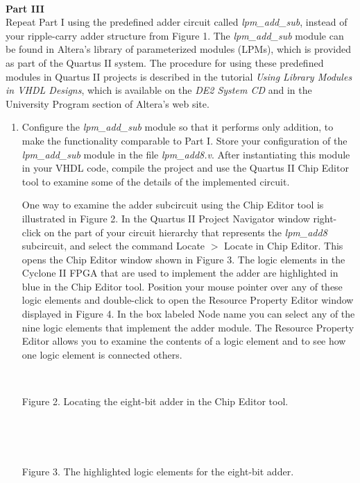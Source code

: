 \documentclass[psfig,10pt,fullpage]{article}
\begin{document}
~\\
\noindent
{\bf Part III}
~\\

\noindent
Repeat Part I using the predefined adder circuit called {\it lpm\_add\_sub}, instead of your
ripple-carry adder structure from Figure 1. The {\it lpm\_add\_sub} module can be found in
Altera's library of parameterized modules (LPMs), which is provided as part of the Quartus
II system.  The procedure for using these predefined modules in Quartus II projects 
is described in the tutorial {\it Using Library Modules in VHDL Designs}, which is available 
on the {\it DE2 System CD} and in the University Program section of Altera's web site.  
\begin{enumerate}
\item Configure the {\it lpm\_add\_sub} module so that it performs only addition, to make
the functionality comparable to Part I. Store your configuration of the {\it lpm\_add\_sub} 
module in the file {\it lpm\_add8.v}.  After instantiating this module in your 
VHDL code, compile the project and use the Quartus II Chip Editor tool to examine some 
of the details of the implemented circuit. 

One way to examine the adder subcircuit using the Chip Editor tool is illustrated in
Figure 2. In the Quartus II Project Navigator window right-click on the part of your
circuit hierarchy that represents the {\it lpm\_add8} subcircuit, and select the command
{\sf Locate} $>$ {\sf Locate in Chip Editor}. This opens the Chip Editor window 
shown in Figure 3. The logic elements in the Cyclone II FPGA that are used to implement
the adder are highlighted in blue in the Chip Editor tool.
Position your mouse pointer over any of these logic elements and double-click 
to open the Resource Property Editor window displayed in Figure 4. In the box labeled 
{\sf Node name} you can select any of the nine logic elements that implement the adder 
module. The Resource Property Editor allows you to examine the contents of a logic element and
to see how one logic element is connected others.

\begin{figure}[H]
\scriptsize
\centerline{
\hbox{}}
\end{figure}
~\\
\centerline{Figure 2.  Locating the eight-bit adder in the Chip Editor tool.}
~\\

\begin{figure}[H]
\scriptsize
\centerline{
\hbox{}}
\end{figure}
~\\
\centerline{Figure 3.  The highlighted logic elements for the eight-bit adder.}
~\\


\end{enumerate}
\end{document}

